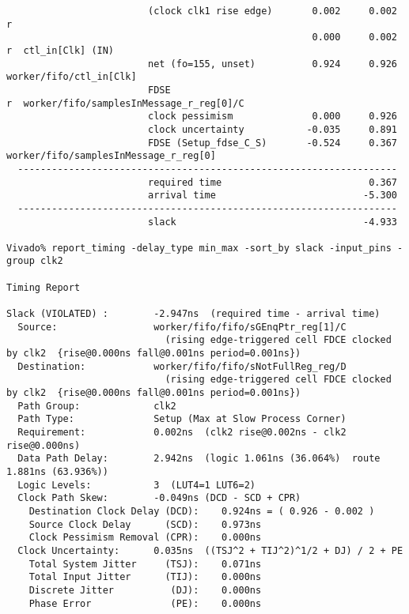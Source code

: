 \documentclass{article}
\begin{document}
\begin{lstlisting}
                         (clock clk1 rise edge)       0.002     0.002 r  
                                                      0.000     0.002 r  ctl_in[Clk] (IN)
                         net (fo=155, unset)          0.924     0.926    worker/fifo/ctl_in[Clk]
                         FDSE                                         r  worker/fifo/samplesInMessage_r_reg[0]/C
                         clock pessimism              0.000     0.926    
                         clock uncertainty           -0.035     0.891    
                         FDSE (Setup_fdse_C_S)       -0.524     0.367    worker/fifo/samplesInMessage_r_reg[0]
  -------------------------------------------------------------------
                         required time                          0.367    
                         arrival time                          -5.300    
  -------------------------------------------------------------------
                         slack                                 -4.933    

Vivado% report_timing -delay_type min_max -sort_by slack -input_pins -group clk2

Timing Report

Slack (VIOLATED) :        -2.947ns  (required time - arrival time)
  Source:                 worker/fifo/fifo/sGEnqPtr_reg[1]/C
                            (rising edge-triggered cell FDCE clocked by clk2  {rise@0.000ns fall@0.001ns period=0.001ns})
  Destination:            worker/fifo/fifo/sNotFullReg_reg/D
                            (rising edge-triggered cell FDCE clocked by clk2  {rise@0.000ns fall@0.001ns period=0.001ns})
  Path Group:             clk2
  Path Type:              Setup (Max at Slow Process Corner)
  Requirement:            0.002ns  (clk2 rise@0.002ns - clk2 rise@0.000ns)
  Data Path Delay:        2.942ns  (logic 1.061ns (36.064%)  route 1.881ns (63.936%))
  Logic Levels:           3  (LUT4=1 LUT6=2)
  Clock Path Skew:        -0.049ns (DCD - SCD + CPR)
    Destination Clock Delay (DCD):    0.924ns = ( 0.926 - 0.002 ) 
    Source Clock Delay      (SCD):    0.973ns
    Clock Pessimism Removal (CPR):    0.000ns
  Clock Uncertainty:      0.035ns  ((TSJ^2 + TIJ^2)^1/2 + DJ) / 2 + PE
    Total System Jitter     (TSJ):    0.071ns
    Total Input Jitter      (TIJ):    0.000ns
    Discrete Jitter          (DJ):    0.000ns
    Phase Error              (PE):    0.000ns


\end{lstlisting}
\end{document}
